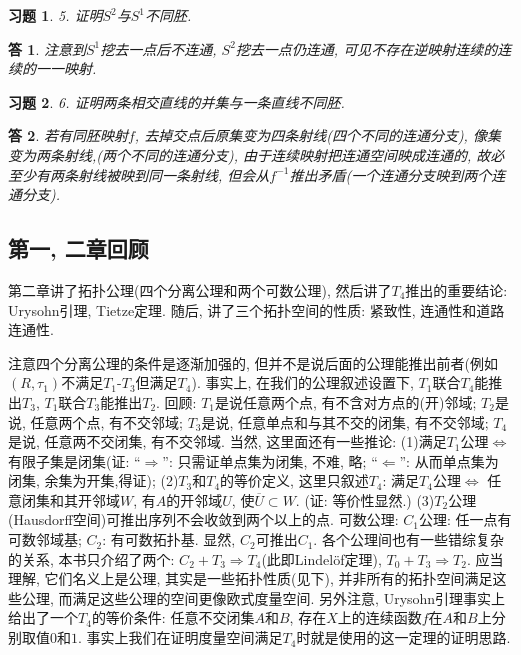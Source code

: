 \documentclass{ctexart}%
\newtheorem*{exercise}{习题}
\newtheorem*{solution}{答}
\theoremstyle{definition}
\theoremstyle{remark}
\begin{document}
\begin{exercise}5. 证明$S^2$与$S^1$不同胚.
\end{exercise}
\begin{solution}
注意到$S^1$挖去一点后不连通, $S^2$挖去一点仍连通, 可见不存在逆映射连续的连续的一一映射.
\end{solution}

\begin{exercise}6. 证明两条相交直线的并集与一条直线不同胚.
\end{exercise}
\begin{solution}若有同胚映射$f$, 去掉交点后原集变为四条射线(四个不同的连通分支), 像集变为两条射线,(两个不同的连通分支), 由于连续映射把连通空间映成连通的, 故必至少有两条射线被映到同一条射线, 但会从$f^{-1}$推出矛盾(一个连通分支映到两个连通分支). 
\end{solution}

\subsection*{第一, 二章回顾}

第二章讲了拓扑公理(四个分离公理和两个可数公理), 然后讲了$T_4$推出的重要结论: Urysohn引理, Tietze定理.
随后, 讲了三个拓扑空间的性质: 紧致性, 连通性和道路连通性. 

注意四个分离公理的条件是逐渐加强的, 但并不是说后面的公理能推出前者(例如$(R,\tau_1)$不满足$T_1$-$T_3$但满足$T_4$). 事实上, 在我们的公理叙述设置下, $T_1$联合$T_4$能推出$T_3$, $T_1$联合$T_3$能推出$T_2$. 回顾: $T_1$是说任意两个点, 有不含对方点的(开)邻域; $T_2$是说, 任意两个点, 有不交邻域; $T_3$是说, 任意单点和与其不交的闭集, 有不交邻域; $T_4$是说, 任意两不交闭集, 有不交邻域. 当然, 这里面还有一些推论: (1)满足$T_1$公理$\Longleftrightarrow$有限子集是闭集(证: ``$\Longrightarrow$'': 只需证单点集为闭集, 不难, 略; ``$\Longleftarrow$'': 从而单点集为闭集, 余集为开集,得证); (2)$T_3$和$T_4$的等价定义, 这里只叙述$T_4$: 满足$T_4$公理$\Longleftrightarrow$ 任意闭集和其开邻域$W$, 有$A$的开邻域$U$, 使$\overline{U}\subset W$. (证: 等价性显然.) (3)$T_2$公理(Hausdorff空间)可推出序列不会收敛到两个以上的点. 可数公理: $C_1$公理: 任一点有可数邻域基; $C_2$: 有可数拓扑基. 显然, $C_2$可推出$C_1$. 各个公理间也有一些错综复杂的关系, 本书只介绍了两个: $C_2+T_3\Longrightarrow T_4$(此即Lindel\"{o}f定理), $T_0+T_3\Longrightarrow T_2$. 应当理解, 它们名义上是公理, 其实是一些拓扑性质(见下), 并非所有的拓扑空间满足这些公理, 而满足这些公理的空间更像欧式度量空间. 另外注意, Urysohn引理事实上给出了一个$T_4$的等价条件: 任意不交闭集$A$和$B$, 存在$X$上的连续函数$f$在$A$和$B$上分别取值$0$和$1$. 事实上我们在证明度量空间满足$T_4$时就是使用的这一定理的证明思路. 
\end{document}

